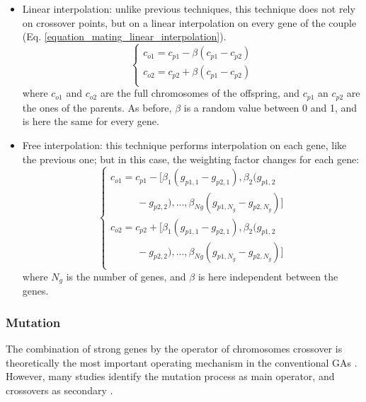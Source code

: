 \documentclass{ametsoc}
\begin{document}
\begin{itemize}
	\item Linear interpolation: unlike previous techniques, this technique does not rely on crossover points, but on a linear interpolation on every gene of the couple (Eq. \ref{equation_mating_linear_interpolation}).
	\begin{equation}
	\left\lbrace \begin{array}{l} 
	c_{o1} = c_{p1} - \beta (c_{p1} - c_{p2}) \\
	c_{o2} = c_{p2} + \beta (c_{p1} - c_{p2}) \\
	\end{array} \right.
	\label{equation_mating_linear_interpolation}
	\end{equation}
	where $c_{o1}$ and $c_{o2}$ are the full chromosomes of the offspring, and $c_{p1}$ an $c_{p2}$ are the ones of the parents. As before, $\beta$ is a random value between 0 and 1, and is here the same for every gene.
	
	\item Free interpolation: this technique performs interpolation on each gene, like the previous one; but in this case, the weighting factor changes for each gene:
	\begin{equation}
	\left\lbrace \begin{array}{l} 
	c_{o1} = c_{p1} - [\beta_{1} (g_{p1,1} - g_{p2,1}), \beta_{2} (g_{p1,2}\\
	~~~~~~~~~~~~ - g_{p2,2}), ..., \beta_{Ng} (g_{p1,N_{g}} - g_{p2,N_{g}})] \\
	c_{o2} = c_{p2} + [\beta_{1} (g_{p1,1} - g_{p2,1}), \beta_{2} (g_{p1,2}\\
	~~~~~~~~~~~~ - g_{p2,2}), ..., \beta_{Ng} (g_{p1,N_{g}} - g_{p2,N_{g}})] \\
	\end{array} \right.
	\label{equation_mating_free_interpolation}
	\end{equation}
	where $N_{g}$ is the number of genes, and $\beta$ is here independent between the genes.
	
\end{itemize}


\subsubsection{Mutation}
\label{sec:gas:mutation}

The combination of strong genes by the operator of chromosomes crossover is theoretically the most important operating mechanism in the conventional GAs \citep{Holland1992b,Back1993b}. However, many studies identify the mutation process as main operator, and crossovers as secondary \citep[see][]{Back1992a, Back1996a, Back1996b, Smith1997a, Deb1999, Costa2005a, Costa2007a}.
\end{document}
